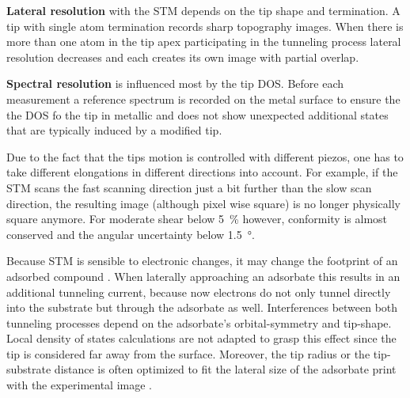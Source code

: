 \textbf{Lateral resolution} with the STM depends on the tip shape and termination. A tip with single atom termination records sharp topography images. When there is more than one atom in the tip apex participating in the tunneling process lateral resolution decreases and each creates its own image with partial overlap.

\textbf{Spectral resolution} is influenced most by the tip DOS. Before each measurement a reference spectrum is recorded on the metal surface to ensure the the DOS fo the tip in metallic and does not show unexpected additional states that are typically induced by a modified tip.

Due to the fact that the tips motion is controlled with different piezos, one has to take different elongations in different directions into account. For example, if the STM scans the fast scanning direction just a bit further than the slow scan direction, the resulting image (although pixel wise square) is no longer physically square anymore. 
For moderate shear below \SI{5}{\percent} however, conformity is almost conserved and the angular uncertainty below \SI{1.5}{\degree}.

Because STM is sensible to electronic changes, it may change the footprint of an adsorbed compound \cite{sautet_interpretation_1992}. When laterally approaching an adsorbate this results in an additional tunneling current, because now electrons do not only tunnel directly into the substrate but through the adsorbate as well. Interferences between both tunneling processes depend on the adsorbate's orbital-symmetry and tip-shape. Local density of states calculations \cite{tersoff_theory_1985, lang_theory_1986, eigler_imaging_1991} are not adapted to grasp this effect since the tip is considered far away from the surface. Moreover, the tip radius or the tip-substrate distance is often optimized to fit the lateral size of the adsorbate print with the experimental image \cite{tersoff_theory_1985, eigler_imaging_1991}. 

